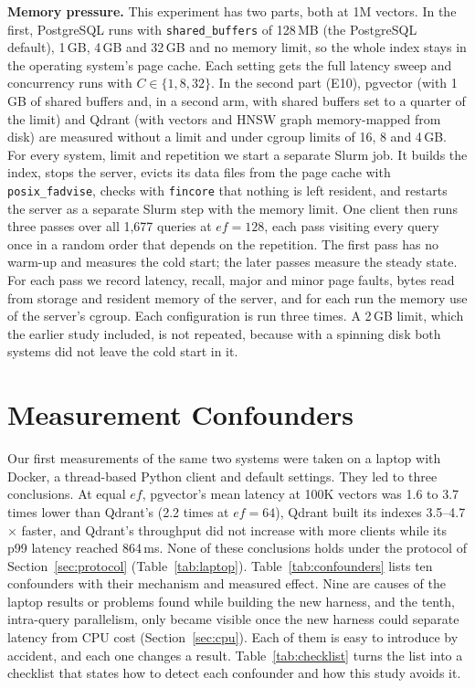 \documentclass[sigconf, nonacm]{acmart}
\begin{document}
\textbf{Memory pressure.} This experiment has two parts, both at 1M vectors. In the
first, PostgreSQL runs with \texttt{shared\_buffers} of 128\,MB (the PostgreSQL
default), 1\,GB, 4\,GB and 32\,GB and no memory limit, so the whole index stays in the
operating system's page cache. Each setting gets the full latency sweep and concurrency
runs with $C\in\{1,8,32\}$. In the second part (E10), pgvector (with 1\,GB of shared buffers and, in a second
arm, with shared buffers set to a quarter of the limit) and Qdrant (with vectors and HNSW
graph memory-mapped from disk) are measured without a limit and under cgroup limits of 16,
8 and 4\,GB. For every system, limit and repetition we start a separate Slurm job. It builds
the index, stops the server, evicts its data files from the page cache with
\texttt{posix\_fadvise}, checks with \texttt{fincore} that nothing is left resident, and
restarts the server as a separate Slurm step with the memory limit. One client then runs
three passes over all 1{,}677 queries at $ef=128$, each pass visiting every query once in
a random order that depends on the repetition. The first pass has no warm-up and measures
the cold start; the later passes measure the steady state. For each pass we record
latency, recall, major and minor page faults, bytes read from storage and resident memory
of the server, and for each run the memory use of the server's cgroup. Each configuration
is run three times. A 2\,GB limit, which the earlier study included, is not repeated,
because with a spinning disk both systems did not leave the cold start in it.

\section{Measurement Confounders}
\label{sec:confounders}

Our first measurements of the same two systems were taken on a laptop with Docker, a
thread-based Python client and default settings. They led to three conclusions. At equal
$ef$, pgvector's mean latency at 100K vectors was 1.6 to 3.7 times lower than Qdrant's
(2.2 times at $ef=64$), Qdrant built its indexes 3.5--4.7$\times$ faster, and Qdrant's
throughput did not increase with more clients while its p99 latency reached 864\,ms. None
of these conclusions holds under the protocol of Section~\ref{sec:protocol}
(Table~\ref{tab:laptop}). Table~\ref{tab:confounders} lists ten confounders with their
mechanism and measured effect. Nine are causes of the laptop results or problems found
while building the new harness, and the tenth, intra-query parallelism, only became
visible once the new harness could separate latency from CPU cost
(Section~\ref{sec:cpu}). Each of them is easy to introduce by accident, and each one
changes a result. Table~\ref{tab:checklist} turns the list into a checklist that states
how to detect each confounder and how this study avoids it.
\end{document}
